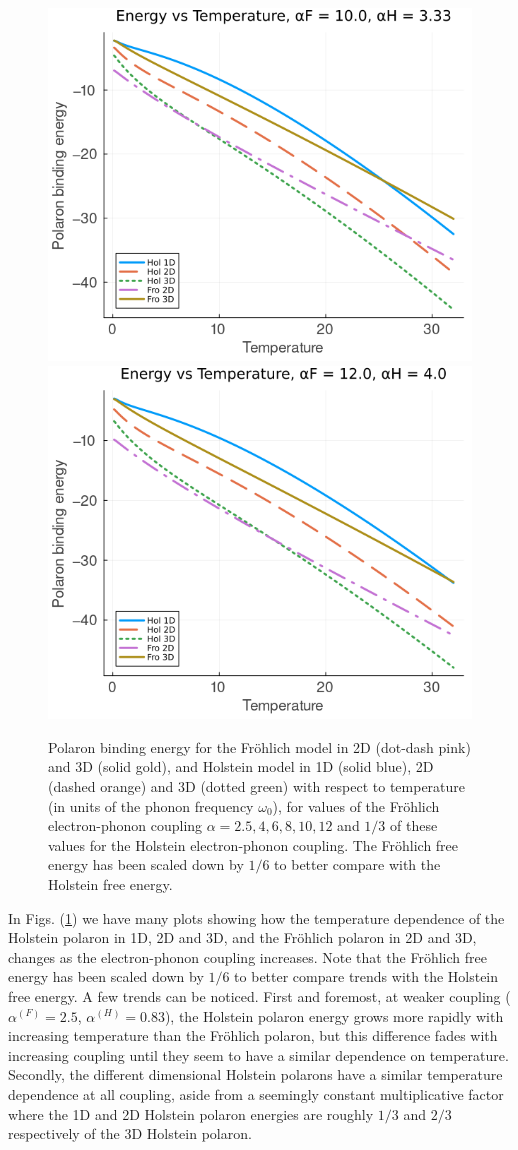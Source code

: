 \begin{figure}[!tbp]
    \includegraphics[width=.49\textwidth]{figures/energy_temp_10_333.png}
    \includegraphics[width=.49\textwidth]{figures/energy_temp_12_4.png}
    \caption{Polaron binding energy for the Fr\"ohlich model in 2D (dot-dash pink) and 3D (solid gold), and Holstein model in 1D (solid blue), 2D (dashed orange) and 3D (dotted green) with respect to temperature (in units of the phonon frequency $\omega_0$), for values of the Fr\"ohlich electron-phonon coupling $\alpha = 2.5, 4, 6, 8, 10, 12$ and $1/3$ of these values for the Holstein electron-phonon coupling. The Fr\"ohlich free energy has been scaled down by $1/6$ to better compare with the Holstein free energy.}
    \label{fig:energy_temp}
\end{figure}

In Figs. (\ref{fig:energy_temp}) we have many plots showing how the temperature dependence of the Holstein polaron in 1D, 2D and 3D, and the Fr\"ohlich polaron in 2D and 3D, changes as the electron-phonon coupling increases. Note that the Fr\"ohlich free energy has been scaled down by $1/6$ to better compare trends with the Holstein free energy. A few trends can be noticed. First and foremost, at weaker coupling ($\alpha^{(F)} = 2.5$, $\alpha^{(H)} = 0.83$), the Holstein polaron energy grows more rapidly with increasing temperature than the Fr\"ohlich polaron, but this difference fades with increasing coupling until they seem to have a similar dependence on temperature. Secondly, the different dimensional Holstein polarons have a similar temperature dependence at all coupling, aside from a seemingly constant multiplicative factor where the 1D and 2D Holstein polaron energies are roughly $1/3$ and $2/3$ respectively of the 3D Holstein polaron. 

